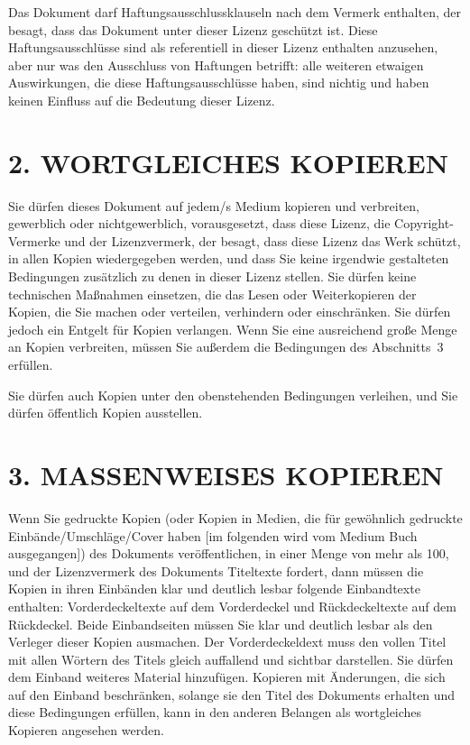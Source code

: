 Das Dokument darf Haftungsausschlussklauseln nach dem Vermerk enthalten, der 
besagt, dass das Dokument unter dieser Lizenz geschützt ist. Diese Haftungsausschlüsse
sind als referentiell in dieser Lizenz enthalten anzusehen, aber nur was
den Ausschluss von Haftungen betrifft: alle weiteren etwaigen Auswirkungen, die
diese Haftungsausschlüsse haben, sind nichtig und haben keinen Einfluss auf die
Bedeutung dieser Lizenz.

\section*{2. WORTGLEICHES KOPIEREN}

Sie dürfen dieses Dokument auf jedem/s Medium kopieren und verbreiten, gewerblich
oder nichtgewerblich, vorausgesetzt, dass diese Lizenz, die Copyright-Vermerke
und der Lizenzvermerk, der besagt, dass diese Lizenz das Werk schützt, in allen
Kopien wiedergegeben werden, und dass Sie keine irgendwie gestalteten Bedingungen 
zusätzlich zu denen in dieser Lizenz stellen. Sie dürfen keine technischen
Maßnahmen einsetzen, die das Lesen oder Weiterkopieren der Kopien, die Sie machen oder
verteilen, verhindern oder einschränken. Sie dürfen jedoch ein Entgelt für Kopien
verlangen. Wenn Sie eine ausreichend große Menge an Kopien verbreiten,
müssen Sie außerdem die Bedingungen des Abschnitts~3 erfüllen.

Sie dürfen auch Kopien unter den obenstehenden Bedingungen verleihen, und Sie dürfen
öffentlich Kopien ausstellen.


\section*{3. MASSENWEISES KOPIEREN}

Wenn Sie gedruckte Kopien (oder Kopien in Medien, die für gewöhnlich gedruckte 
Einbände/Umschläge/Cover haben [im folgenden wird vom Medium Buch ausgegangen]) des Dokuments veröffentlichen, in einer Menge von mehr als 100, und der
Lizenzvermerk des Dokuments Titeltexte fordert, dann müssen die Kopien in ihren Einbänden 
klar und deutlich lesbar folgende Einbandtexte enthalten: Vorderdeckeltexte auf
dem Vorderdeckel und Rückdeckeltexte auf dem Rückdeckel. Beide Einbandseiten müssen
Sie klar und deutlich lesbar als den Verleger dieser Kopien ausmachen. Der Vorderdeckeldext 
muss den vollen Titel mit allen Wörtern des Titels gleich auffallend und sichtbar darstellen.
Sie dürfen dem Einband weiteres Material hinzufügen.
Kopieren mit Änderungen, die sich auf den Einband beschränken, solange sie den Titel
des Dokuments erhalten und diese Bedingungen erfüllen, kann in den anderen
Belangen als wortgleiches Kopieren angesehen werden.

